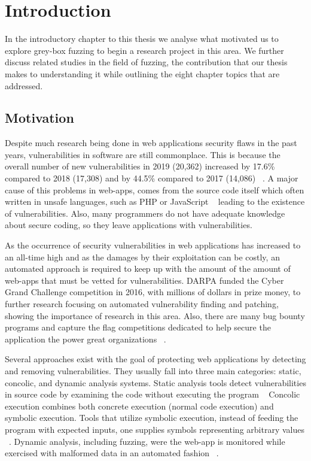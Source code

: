 \chapter{Introduction}
\minitoc
\vspace*{1cm}

In the introductory chapter to this thesis we analyse what motivated us to explore grey-box fuzzing to begin a research project in this area. We further discuss related studies in the field of fuzzing, the contribution that our thesis makes to understanding it while outlining the eight chapter topics that are addressed.

\section{Motivation}

Despite much research being done in web applications security flaws in the past years, vulnerabilities in software are still commonplace. This is because the overall number of new vulnerabilities in 2019 (20,362) increased by 17.6\% compared to 2018 (17,308) and by 44.5\% compared to 2017 (14,086) ~\cite{vulnerabilities2019state,owasp2017}. A major cause of this problems in web-apps, comes from the source code itself which often written in unsafe languages, such as PHP or JavaScript ~\cite{vulnerabilities2019state} leading to the existence of vulnerabilities. Also, many programmers do not have adequate knowledge about secure coding, so they leave applications with vulnerabilities. 

As the occurrence of security vulnerabilities in web applications has increased to an all-time high and as the damages by their exploitation can be costly, an automated approach is required to keep up with the amount of the amount of web-apps that must be vetted for vulnerabilities. DARPA funded the Cyber Grand Challenge competition in 2016, with millions of dollars in prize money, to further research focusing on automated vulnerability finding and patching, showing the importance of research in this area. Also, there are many bug bounty programs and capture the flag competitions dedicated to help secure the application the power great organizations ~\cite{bugbounty}.

Several approaches exist with the goal of protecting web applications by detecting and removing vulnerabilities. They usually fall into three main categories: static, concolic, and dynamic analysis systems. Static analysis tools detect vulnerabilities in source code by examining the code without executing the program ~\cite{balzarotti2008saner,jovanovic2006pixy,jovanovic2006precise,medeiros2014mining,medeiros2016dekant}
Concolic execution combines both concrete execution (\ie normal code execution) and symbolic execution. Tools that utilize symbolic execution, instead of feeding the program with expected inputs, one supplies symbols representing arbitrary values ~\cite{king1976symoblic,Godefroid2008AutomatedWF}. Dynamic analysis, including fuzzing, were the web-app is monitored while exercised with malformed data in an automated fashion ~\cite{mller1990fuzz,godefroid2012sage,doupe2012enemy,duchene2014kameleonfuzz}.

